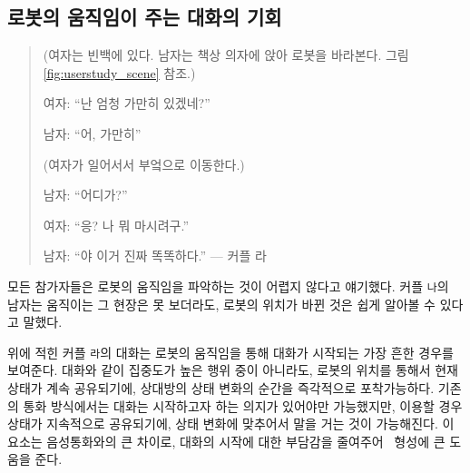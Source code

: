 

\subsection{로봇의 움직임이 주는 대화의 기회}

\begin{quotation}
(여자는 빈백에 있다. 남자는 책상 의자에 앉아 로봇을 바라본다. 그림 \ref{fig:userstudy_scene} 참조.)

여자: ``난 엄청 가만히 있겠네?''

남자: ``어, 가만히''

(여자가 일어서서 부엌으로 이동한다.)

남자: ``어디가?''

여자: ``응? 나 뭐 마시려구.''

남자: ``야 이거 진짜 똑똑하다.'' --- 커플 라
\end{quotation}

모든 참가자들은 로봇의 움직임을 파악하는 것이 어렵지 않다고 얘기했다. 커플 \texttt{나}의 남자는 움직이는 그 현장은 못 보더라도, 로봇의 위치가 바뀐 것은 쉽게 알아볼 수 있다고 말했다. 

위에 적힌 커플 \texttt{라}의 대화는 로봇의 움직임을 통해 대화가 시작되는 가장 흔한 경우를 보여준다. 대화와 같이 집중도가 높은 행위 중이 아니라도, 로봇의 위치를 통해서 현재 상태가 계속 공유되기에, 상대방의 상태 변화의 순간을 즉각적으로 포착가능하다. 기존의 통화 방식에서는 대화는 시작하고자 하는 의지가 있어야만 가능했지만, \sysname\을 이용할 경우 상태가 지속적으로 공유되기에, 상태 변화에 맞추어서 말을 거는 것이 가능해진다. 이 요소는 음성 통화와의 큰 차이로, 대화의 시작에 대한 부담감을 줄여주어 \concept\ 형성에 큰 도움을 준다.



